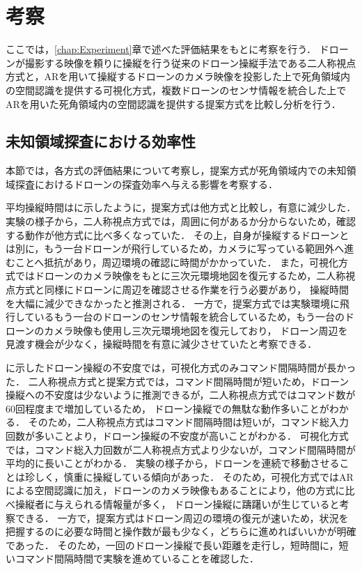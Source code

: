 \documentclass[a4paper,11pt]{ujreport}
\begin{document}
\chapter{考察}
\label{chap:Discussion}

ここでは，\ref{chap:Experiment}章で述べた評価結果をもとに考察を行う．
ドローンが撮影する映像を頼りに操縦を行う従来のドローン操縦手法である二人称視点方式と，ARを用いて操縦するドローンのカメラ映像を投影した上で死角領域内の空間認識を提供する可視化方式，複数ドローンのセンサ情報を統合した上でARを用いた死角領域内の空間認識を提供する提案方式を比較し分析を行う．

\section{未知領域探査における効率性}
\label{sec:Efficiency}

本節では，各方式の評価結果について考察し，提案方式が死角領域内での未知領域探査におけるドローンの探査効率へ与える影響を考察する．
\par
平均操縦時間はに示したように，提案方式は他方式と比較し，有意に減少した．
実験の様子から，二人称視点方式では，周囲に何があるか分からないため，確認する動作が他方式に比べ多くなっていた．
その上，自身が操縦するドローンとは別に，もう一台ドローンが飛行しているため，カメラに写っている範囲外へ進むことへ抵抗があり，周辺環境の確認に時間がかかっていた．
また，可視化方式ではドローンのカメラ映像をもとに三次元環境地図を復元するため，二人称視点方式と同様にドローンに周辺を確認させる作業を行う必要があり，
操縦時間を大幅に減少できなかったと推測される．
一方で，提案方式では実験環境に飛行しているもう一台のドローンのセンサ情報を統合しているため，もう一台のドローンのカメラ映像も使用し三次元環境地図を復元しており，
ドローン周辺を見渡す機会が少なく，操縦時間を有意に減少させていたと考察できる．
\par
{}に示したドローン操縦の不安度では，可視化方式のみコマンド間隔時間が長かった．
二人称視点方式と提案方式では，コマンド間隔時間が短いため，ドローン操縦への不安度は少ないように推測できるが，二人称視点方式ではコマンド数が60回程度まで増加しているため，
ドローン操縦での無駄な動作多いことがわかる．
そのため，二人称視点方式はコマンド間隔時間は短いが，コマンド総入力回数が多いことより，ドローン操縦の不安度が高いことがわかる．
可視化方式では，コマンド総入力回数が二人称視点方式より少ないが，コマンド間隔時間が平均的に長いことがわかる．
実験の様子から，ドローンを連続で移動させることは珍しく，慎重に操縦している傾向があった．
そのため，可視化方式ではARによる空間認識に加え，ドローンのカメラ映像もあることにより，他の方式に比べ操縦者に与えられる情報量が多く，
ドローン操縦に躊躇いが生じていると考察できる．
一方で，提案方式はドローン周辺の環境の復元が速いため，状況を把握するのに必要な時間と操作数が最も少なく，どちらに進めればいいかが明確であった．
そのため，一回のドローン操縦で長い距離を走行し，短時間に，短いコマンド間隔時間で実験を進めていることを確認した．
\end{document}
